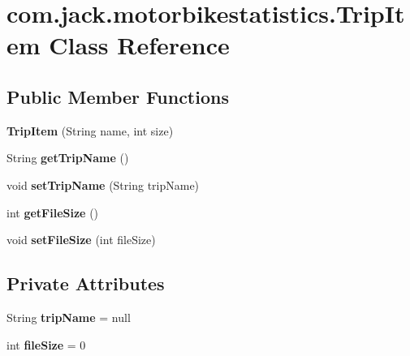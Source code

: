 \hypertarget{classcom_1_1jack_1_1motorbikestatistics_1_1_trip_item}{}\section{com.\+jack.\+motorbikestatistics.\+Trip\+Item Class Reference}
\label{classcom_1_1jack_1_1motorbikestatistics_1_1_trip_item}
\subsection*{Public Member Functions}
\begin{DoxyCompactItemize}
\item 
\mbox{\label{classcom_1_1jack_1_1motorbikestatistics_1_1_trip_item_a17a6df81af0062b7bf03babb4c7433b0}} 
{\bfseries Trip\+Item} (String name, int size)
\item 
\mbox{\label{classcom_1_1jack_1_1motorbikestatistics_1_1_trip_item_a0416f27a3fcd2344fca453f7a2a6b4d0}} 
String {\bfseries get\+Trip\+Name} ()
\item 
\mbox{\label{classcom_1_1jack_1_1motorbikestatistics_1_1_trip_item_a359fbbbde7fde3af75379054c87cfb2d}} 
void {\bfseries set\+Trip\+Name} (String trip\+Name)
\item 
\mbox{\label{classcom_1_1jack_1_1motorbikestatistics_1_1_trip_item_aec0e07444e68e4492daa734bf3d6e24a}} 
int {\bfseries get\+File\+Size} ()
\item 
\mbox{\label{classcom_1_1jack_1_1motorbikestatistics_1_1_trip_item_a133ad3b07e6c5d57203ffdc81f6a51fc}} 
void {\bfseries set\+File\+Size} (int file\+Size)
\end{DoxyCompactItemize}
\subsection*{Private Attributes}
\begin{DoxyCompactItemize}
\item 
\mbox{\label{classcom_1_1jack_1_1motorbikestatistics_1_1_trip_item_a2e678c328ae2972516c2da9d21826359}} 
String {\bfseries trip\+Name} = null
\item 
\mbox{\label{classcom_1_1jack_1_1motorbikestatistics_1_1_trip_item_ac7b1106a5db61eb17cfd3f314a885a3d}} 
int {\bfseries file\+Size} = 0
\end{DoxyCompactItemize}


